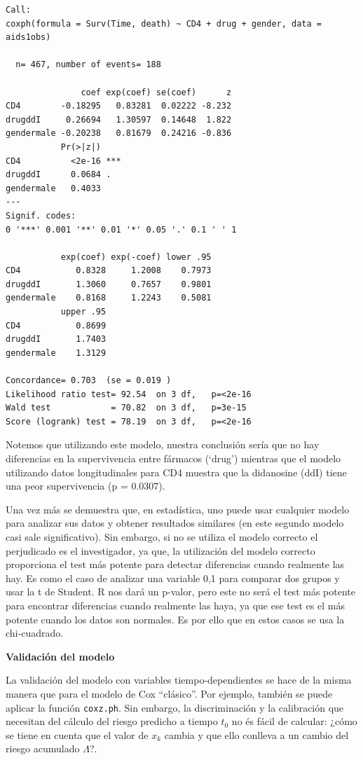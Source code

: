 \documentclass[
]{book}
\begin{document}
\begin{verbatim}
Call:
coxph(formula = Surv(Time, death) ~ CD4 + drug + gender, data = aids1obs)

  n= 467, number of events= 188 

               coef exp(coef) se(coef)      z
CD4        -0.18295   0.83281  0.02222 -8.232
drugddI     0.26694   1.30597  0.14648  1.822
gendermale -0.20238   0.81679  0.24216 -0.836
           Pr(>|z|)    
CD4          <2e-16 ***
drugddI      0.0684 .  
gendermale   0.4033    
---
Signif. codes:  
0 '***' 0.001 '**' 0.01 '*' 0.05 '.' 0.1 ' ' 1

           exp(coef) exp(-coef) lower .95
CD4           0.8328     1.2008    0.7973
drugddI       1.3060     0.7657    0.9801
gendermale    0.8168     1.2243    0.5081
           upper .95
CD4           0.8699
drugddI       1.7403
gendermale    1.3129

Concordance= 0.703  (se = 0.019 )
Likelihood ratio test= 92.54  on 3 df,   p=<2e-16
Wald test            = 70.82  on 3 df,   p=3e-15
Score (logrank) test = 78.19  on 3 df,   p=<2e-16
\end{verbatim}

Notemos que utilizando este modelo, nuestra conclusión sería que no hay diferencias en la supervivencia entre fármacos (`drug') mientras que el modelo utilizando datos longitudinales para CD4 muestra que la didanosine (ddI) tiene una peor supervivencia (p = 0.0307).

Una vez más se demuestra que, en estadística, uno puede usar cualquier modelo para analizar sus datos y obtener resultados similares (en este segundo modelo casi sale significativo). Sin embargo, si no se utiliza el modelo correcto el perjudicado es el investigador, ya que, la utilización del modelo correcto proporciona el test más potente para detectar diferencias cuando realmente las hay. Es como el caso de analizar una variable 0,1 para comparar dos grupos y usar la t de Student. R nos dará un p-valor, pero este no será el test más potente para encontrar diferencias cuando realmente las haya, ya que ese test es el más potente cuando los datos son normales. Es por ello que en estos casos se usa la chi-cuadrado.

\textbf{Validación del modelo}

La validación del modelo con variables tiempo-dependientes se hace de la misma manera que para el modelo de Cox ``clásico''. Por ejemplo, también se puede aplicar la función \texttt{coxz.ph}. Sin embargo, la discriminación y la calibración que necesitan del cálculo del riesgo predicho a tiempo \(t_0\) no és fácil de calcular: ¿cómo se tiene en cuenta que el valor de \(x_k\) cambia y que ello conlleva a un cambio del riesgo acumulado \(\Lambda\)?.
\end{document}
